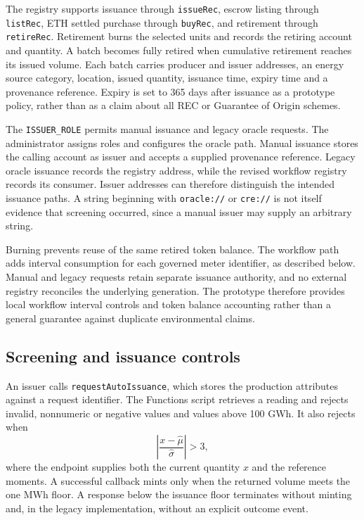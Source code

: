 \documentclass[11pt,a4paper]{article}
\newcommand{\code}[1]{\texttt{\small #1}}
\begin{document}
The registry supports issuance through \code{issueRec}, escrow listing through \code{listRec}, ETH settled purchase through \code{buyRec}, and retirement through \code{retireRec}. Retirement burns the selected units and records the retiring account and quantity. A batch becomes fully retired when cumulative retirement reaches its issued volume. Each batch carries producer and issuer addresses, an energy source category, location, issued quantity, issuance time, expiry time and a provenance reference. Expiry is set to 365 days after issuance as a prototype policy, rather than as a claim about all REC or Guarantee of Origin schemes.

The \code{ISSUER\_ROLE} permits manual issuance and legacy oracle requests. The administrator assigns roles and configures the oracle path. Manual issuance stores the calling account as issuer and accepts a supplied provenance reference. Legacy oracle issuance records the registry address, while the revised workflow registry records its consumer. Issuer addresses can therefore distinguish the intended issuance paths. A string beginning with \code{oracle://} or \code{cre://} is not itself evidence that screening occurred, since a manual issuer may supply an arbitrary string.

Burning prevents reuse of the same retired token balance. The workflow path adds interval consumption for each governed meter identifier, as described below. Manual and legacy requests retain separate issuance authority, and no external registry reconciles the underlying generation. The prototype therefore provides local workflow interval controls and token balance accounting rather than a general guarantee against duplicate environmental claims.

\subsection{Screening and issuance controls}
An issuer calls \code{requestAutoIssuance}, which stores the production attributes against a request identifier. The Functions script retrieves a reading and rejects invalid, nonnumeric or negative values and values above 100 GWh. It also rejects when
\begin{equation}\left|\frac{x-\widehat\mu}{\widehat\sigma}\right|>3,\label{eq:legacy}\end{equation}
where the endpoint supplies both the current quantity $x$ and the reference moments. A successful callback mints only when the returned volume meets the one MWh floor. A response below the issuance floor terminates without minting and, in the legacy implementation, without an explicit outcome event.
\end{document}
